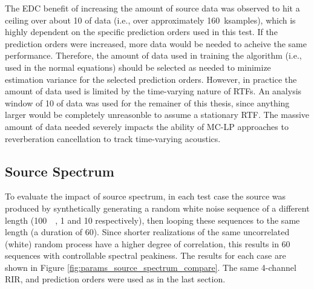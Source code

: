 The EDC benefit of increasing the amount of source data was observed to hit a ceiling over about \qty{10}{\sec} of data (i.e., over approximately \qty{160}{\kilo samples}), which is highly dependent on the specific prediction orders used in this test. If the prediction orders were increased, more data would be needed to acheive the same performance. Therefore, the amount of data used in training the algorithm (i.e., used in the normal equations) should be selected as needed to minimize estimation variance for the selected prediction orders. However, in practice the amount of data used is limited by the time-varying nature of RTFs. An analysis window of \qty{10}{\sec} of data was used for the remainer of this thesis, since anything larger would be completely unreasonble to assume a stationary RTF. The massive amount of data needed severely impacts the ability of MC-LP approaches to reverberation cancellation to track time-varying acoustics.

\subsection{Source Spectrum}

To evaluate the impact of source spectrum, in each test case the source was produced by synthetically generating a random white noise sequence of a different length (\qty{100}{\milli\sec}, \qty{1}{\sec} and \qty{10}{\sec} respectively), then looping these sequences to the same length (a duration of \qty{60}{\sec}). Since shorter realizations of the same uncorrelated (white) random process have a higher degree of correlation, this results in \qty{60}{\sec} sequences with controllable spectral peakiness. The results for each case are shown in Figure \ref{fig:params_source_spectrum_compare}. The same 4-channel RIR, and prediction orders were used as in the last section.


